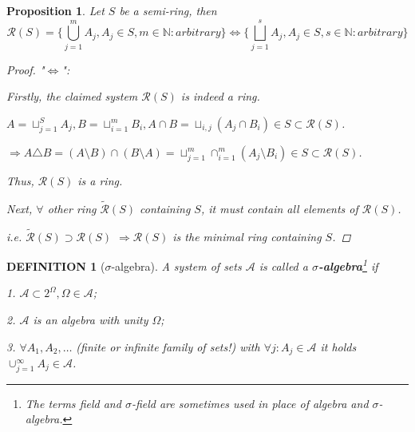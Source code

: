 \documentclass[12pt]{article}
\theoremstyle{blueplain}
\newtheorem{proposition}[theorem]{Proposition}
\theoremstyle{bluedef}
\newtheorem{definition}{DEFINITION}[section]
\theoremstyle{blueremark}
\newcommand{\N}{\mathbb{N}}
\numberwithin{equation}{section}
\begin{document}
\begin{proposition}
  Let $S$ be a semi-ring, then
  $$\mathcal{R}(S) = \{\bigcup_{j=1}^m A_j, A_j \in S, m \in \N: arbitrary\} \Leftrightarrow \{\bigsqcup_{j=1}^s A_j, A_j \in S, s \in \N: arbitrary\}$$
  \begin{proof}
    "$\Leftrightarrow$":

    Firstly, the claimed system $\mathcal{R}(S)$ is indeed a ring.

    $A = \sqcup_{j=1}^S A_j, B = \sqcup_{i = 1}^m B_i, A \cap B = \sqcup_{i,j}(A_j \cap B_i) \in S \subset \mathcal{R}(S)$.

    $\Rightarrow A \triangle B = (A \setminus B) \cap (B \setminus A)  = \sqcup_{j=1}^m \cap_{i=1}^m (A_j \setminus B_i) \in S \subset \mathcal{R}(S)$.

    Thus, $\mathcal{R}(S)$ is a ring.

    Next, $\forall$ other ring $\tilde{\mathcal{R}}(S)$ containing $S$, it must contain all elements of $\mathcal{R}(S)$.

    i.e. $\tilde{\mathcal{R}}(S) \supset \mathcal{R}(S)$ $\Rightarrow \mathcal{R}(S)$ is the minimal ring containing $S$.
  \end{proof}
\end{proposition}


\begin{definition}[$\sigma$-algebra]

  A system of sets $\mathcal{A}$ is called a \textbf{$\sigma$-algebra}\footnote[1]{The terms \textit{field} and \textit{$\sigma$-field} are sometimes used in place of algebra and $\sigma$-algebra.} if

  1. $\mathcal{A} \subset 2^{\Omega}, \Omega \in \mathcal{A}$;

  2. $\mathcal{A}$ is an algebra with unity $\Omega$;

  3. $\forall A_1, A_2, \ldots$ (finite or infinite family of sets!) with $\forall j: A_j \in \mathcal{A}$ it holds $\cup_{j=1}^{\infty} A_j \in \mathcal{A}$.
\end{definition}
\end{document}
